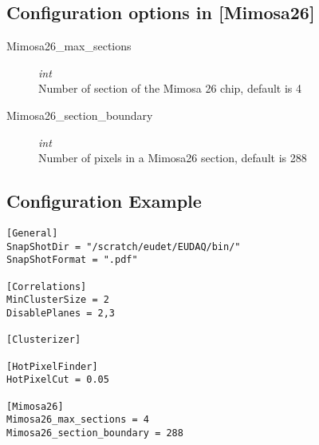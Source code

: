 \subsection{Configuration options in [Mimosa26]}
\begin{description}
\item[Mimosa26\_max\_sections] \textit{int} \\
Number of section of the Mimosa 26 chip, default is 4   
\item[Mimosa26\_section\_boundary] \textit{int} \\ 
Number of pixels in a Mimosa26 section, default is 288
\end{description}

\subsection{Configuration Example}
\begin{verbatim}
[General]
SnapShotDir = "/scratch/eudet/EUDAQ/bin/"
SnapShotFormat = ".pdf"

[Correlations]
MinClusterSize = 2
DisablePlanes = 2,3

[Clusterizer]

[HotPixelFinder]
HotPixelCut = 0.05

[Mimosa26]
Mimosa26_max_sections = 4 
Mimosa26_section_boundary = 288
\end{verbatim}
